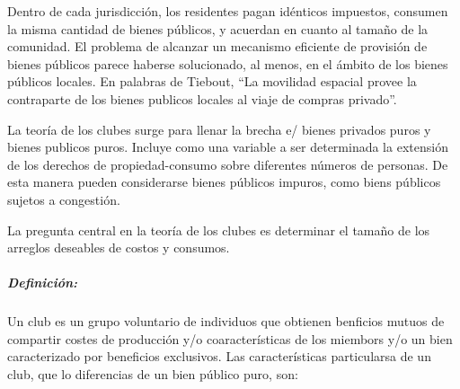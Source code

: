 \begin{enumerate}
Dentro de cada jurisdicción, los residentes pagan idénticos impuestos, consumen la misma cantidad de bienes públicos, y acuerdan en cuanto al tamaño de la comunidad. El problema de alcanzar un mecanismo eficiente de provisión de bienes públicos parece haberse solucionado, al menos, en el ámbito de los bienes públicos locales.
En palabras de Tiebout, ``La movilidad espacial provee la contraparte de los bienes publicos locales al viaje de compras privado''.

La teoría de los clubes surge para llenar la brecha e/ bienes privados puros y bienes publicos puros. Incluye como una variable a ser determinada la extensión de los derechos de propiedad-consumo sobre diferentes números de personas. De esta manera pueden considerarse bienes públicos impuros, como biens públicos sujetos a congestión.

La pregunta central en la teoría de los clubes es determinar el tamaño de los arreglos deseables de costos y consumos.

\subparagraph{Definición:} Un club es un grupo voluntario de individuos que obtienen benficios mutuos de compartir costes de producción y/o coaracterísticas de los miembors y/o un bien caracterizado por beneficios exclusivos.
Las características particularsa de un club, que lo diferencias de un bien público puro, son:


\end{enumerate}

